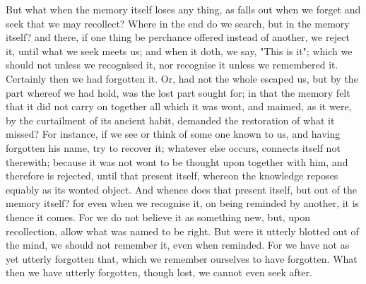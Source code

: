 \documentclass[b5paper,openright,12pt,twoside]{book}
\begin{document}
But what when the memory itself loses any thing, as falls out when we
forget and seek that we may recollect? Where in the end do we search,
but in the memory itself? and there, if one thing be perchance offered
instead of another, we reject it, until what we seek meets us; and when
it doth, we say, "This is it"; which we should not unless we recognised
it, nor recognise it unless we remembered it. Certainly then we had
forgotten it. Or, had not the whole escaped us, but by the part whereof
we had hold, was the lost part sought for; in that the memory felt that
it did not carry on together all which it was wont, and maimed, as it
were, by the curtailment of its ancient habit, demanded the restoration
of what it missed? For instance, if we see or think of some one known
to us, and having forgotten his name, try to recover it; whatever else
occurs, connects itself not therewith; because it was not wont to be
thought upon together with him, and therefore is rejected, until that
present itself, whereon the knowledge reposes equably as its wonted
object. And whence does that present itself, but out of the memory
itself? for even when we recognise it, on being reminded by another, it
is thence it comes. For we do not believe it as something new, but,
upon recollection, allow what was named to be right. But were it utterly
blotted out of the mind, we should not remember it, even when reminded.
For we have not as yet utterly forgotten that, which we remember
ourselves to have forgotten. What then we have utterly forgotten, though
lost, we cannot even seek after.
\end{document}
